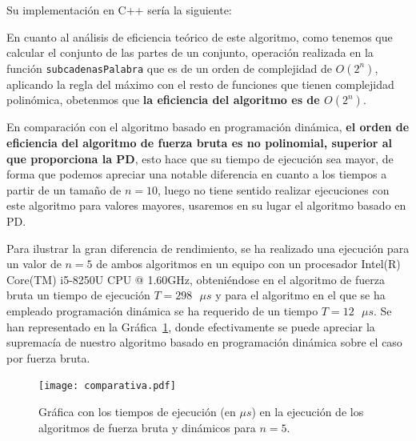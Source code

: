 Su implementación en C++ sería la siguiente:



En cuanto al análisis de eficiencia teórico de este algoritmo, como tenemos que calcular el conjunto de las partes de un conjunto, operación realizada en la función 
\texttt{subcadenasPalabra} que es de un orden de complejidad de $O(2^{n})$, aplicando la regla del máximo con el resto de funciones que tienen complejidad polinómica, obetenmos que \textbf{la eficiencia del algoritmo es de $O(2^{n})$}.

En comparación con el algoritmo basado en programación dinámica, \textbf{el orden de eficiencia del algoritmo de fuerza bruta es no polinomial, superior al que proporciona la PD}, esto hace que su tiempo de ejecución sea mayor, de forma que podemos apreciar una notable diferencia en cuanto a los tiempos a partir de un 
tamaño de $n=10$, luego no tiene sentido realizar ejecuciones con este algoritmo
para valores mayores, usaremos en su lugar el algoritmo basado en PD.

Para ilustrar la gran diferencia de rendimiento, se ha realizado una ejecución
para un valor de $n=5$ de ambos algoritmos en un equipo con un procesador 
Intel(R) Core(TM) i5-8250U CPU @ 1.60GHz, obteniéndose en el algoritmo de fuerza
bruta un tiempo de ejecución $T = 298 \text{ }\mu s $ y para el algoritmo en el que se 
ha empleado programación dinámica se ha requerido de un tiempo $ T = 12 \text{ } \mu s$. 
Se han representado en
la Gráfica~\ref{graph:comp}, donde efectivamente se puede apreciar la supremacía
de nuestro algoritmo basado en programación dinámica sobre el caso por fuerza bruta. 


\begin{figure}[h]
  \centering
  \texttt{[image: comparativa.pdf]}
  \caption{Gráfica con los tiempos de ejecución (en $\mu s$) en la ejecución de los algoritmos de fuerza bruta
  y dinámicos para $n=5$. }
  \label{graph:comp}
\end{figure}